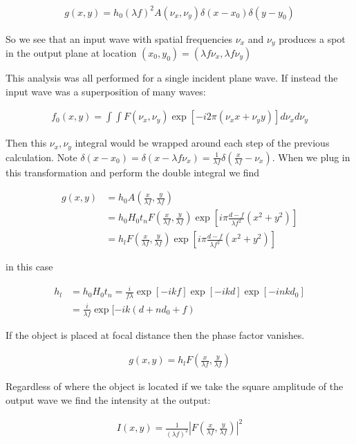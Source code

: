 \documentclass[12pt]{article}
\begin{document}
\begin{align}
g(x,y) = h_0(\lambda f)^2 A(\nu_x,\nu_y) \delta(x-x_0)\delta(y-y_0)
\end{align}

So we see that an input wave with spatial frequencies $\nu_x$ and $\nu_y$ produces a spot in the output plane at location $(x_0,y_0) = (\lambda f \nu_x, \lambda f \nu_y)$

This analysis was all performed for a single incident plane wave. If instead the input wave was a superposition of many waves:

\begin{align}
f_0(x,y) = \int \int F(\nu_x,\nu_y) \exp[-i2\pi(\nu_x x + \nu_y y)] d\nu_x d\nu_y
\end{align}

Then this $\nu_x, \nu_y$ integral would be wrapped around each step of the previous calculation. Note $\delta(x-x_0) = \delta(x - \lambda f \nu_x) = \frac{1}{\lambda f} \delta(\frac{x}{\lambda f} - \nu_x)$. When we plug in this transformation and perform the double integral we find

\begin{align}
g(x,y) &= h_0 A\left(\frac{x}{\lambda f}, \frac{y}{\lambda f}\right)\\
&= h_0 H_0 t_n F\left(\frac{x}{\lambda f}, \frac{y}{\lambda f}\right) \exp\left[i\pi\frac{d-f}{\lambda f^2} (x^2+y^2)\right]\\
&= h_l F\left(\frac{x}{\lambda f}, \frac{y}{\lambda f}\right) \exp\left[i\pi\frac{d-f}{\lambda f^2} (x^2+y^2)\right]
\end{align}

in this case

\begin{align}
h_l &= h_0 H_0 t_n = \frac{i}{f\lambda} \exp[-ikf]\exp[-ikd]\exp[-inkd_0]\\
&= \frac{i}{\lambda f} \exp[-ik(d+nd_0 +f)
\end{align}

If the object is placed at focal distance then the phase factor vanishes.

\begin{align}
g(x,y) = h_l F\left(\frac{x}{\lambda f}, \frac{y}{\lambda f}\right)
\end{align}

Regardless of where the object is located if we take the square amplitude of the output wave we find the intensity at the output:

\begin{align}
I(x,y) = \frac{1}{(\lambda f)^2} \left| F\left(\frac{x}{\lambda f}, \frac{y}{\lambda f}\right)\right|^2
\end{align}
\end{document}
